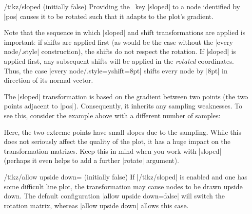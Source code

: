 {\begin{key}{/tikz/sloped (initially false)}
	Providing the \Tikz\ key |sloped| to a node identified by |pos| causes it to be rotated such that it adapts to the plot's gradient.
\pgfplotsexpensiveexample
\begin{codeexample}[]
\end{codeexample}
	Note that the sequence in which |sloped| and shift transformations are applied is important: if shifts are applied first (as would be the case without the |every node/.style| construction), the shifts do not respect the rotation. If |sloped| is applied first, any subsequent shifts will be applied in the \emph{rotated} coordinates. Thus, the case |every node/.style={yshift=8pt}| shifts every node by |8pt| in direction of its normal vector.

	The |sloped| transformation is based on the gradient between two points (the two points adjacent to |pos|). Consequently, it inherits any sampling weaknesses. To see this, consider the example above with a different number of samples:
\pgfplotsexpensiveexample
\begin{codeexample}[]
\end{codeexample}
	\noindent Here, the two extreme points have small slopes due to the sampling. While this does not seriously affect the quality of the plot, it has a huge impact on the transformation matrizes. Keep this in mind when you work with |sloped| (perhaps it even helps to add a further |rotate| argument).
\end{key}

\begin{key}{/tikz/allow upside down= (initially false)}
	If |/tikz/sloped| is enabled and one has some difficult line plot, the transformation may cause nodes to be drawn upside down. The default configuration |allow upside down=false| will switch the rotation matrix, whereas |allow upside down| allows this case.
\end{key}

}
